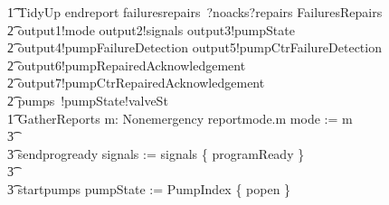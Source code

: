 \documentclass{report} %
\begin{document}
\begin{circusaction}
        \t1 TidyUp \circdef endreport \then failuresrepairs~?noacks?repairs \then \lschexpract FailuresRepairs \rschexpract \circseq \\
            \t2 output1!mode \then output2!signals \then output3!pumpState \then \\
            \t2 output4!pumpFailureDetection \then output5!pumpCtrFailureDetection \then \\
            \t2 output6!pumpRepairedAcknowledgement \then \\
            \t2 output7!pumpCtrRepairedAcknowledgement \then \\
            \t2 pumps~!pumpState!valveSt \then \Skip \\ %
        \t1 GatherReports \circdef \Extchoice m: Nonemergency \circspot reportmode.m \then mode := m
                    \\ %
                    \t3 \extchoice
                    \\ %
                    \t3 sendprogready \then signals := signals \cup \{ programReady \}
                    \\ %
                    \t3 \extchoice
                    \\ %
                    \t3 startpumps \then pumpState := PumpIndex \cross \{ popen \}
                    \\ %

\end{circusaction}
\end{document}
